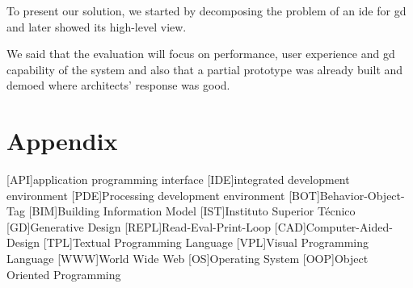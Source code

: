 \documentclass{./llncs2e/llncs}
\begin{document}
	To present our solution, we started by decomposing the problem of an \ac{ide} for \ac{gd} and later showed its high-level view.
	
	We said that the evaluation will focus on performance, user experience and \ac{gd} capability of the system and also that a partial prototype was already built and demoed where architects' response was good.
	
\newpage
\appendix
\section{Appendix}
\label{sec:attachments}

\begin{acronym}
	[API]{application programming interface}
	[IDE]{integrated development environment}
	[PDE]{Processing development environment}
	[BOT]{Behavior-Object-Tag}
	[BIM]{Building Information Model}
	[IST]{Instituto Superior Técnico}
	[GD]{Generative Design}
	[REPL]{Read-Eval-Print-Loop}
	[CAD]{Computer-Aided-Design}
	[TPL]{Textual Programming Language}
	[VPL]{Visual Programming Language}
	[WWW]{World Wide Web}
	[OS]{Operating System}
	[OOP]{Object Oriented Programming}
\end{acronym}

% 
% 
 

 
\end{document}
